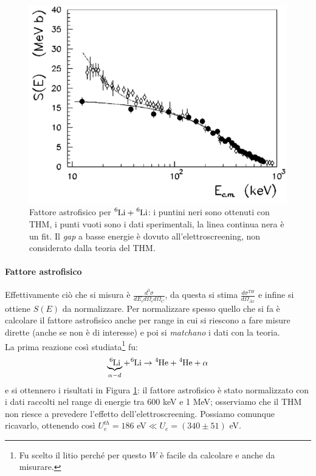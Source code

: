 \vspace{-1cm}
\begin{figure}[!h]
	\centering
	\includegraphics[scale=0.5]{Immagini/0421_Se.png}
	\caption{Fattore astrofisico per $\ce{^6Li} + \ce{^6Li}$: i puntini neri sono ottenuti con THM, i punti vuoti sono i dati sperimentali, la linea continua nera è un fit. Il \textit{gap} a basse energie è dovuto all'elettroscreening, non considerato dalla teoria del THM.}
	\label{0421_Se}
\end{figure}
\paragraph{Fattore astrofisico} Effettivamente ciò che si misura è $\frac{d^3\sigma}{dE_c d\Omega_cd\Omega_{C}}$, da questa si stima $\frac{d\sigma^{TH}}{d\Omega_{Ax}}$ e infine si ottiene $S(E)$ da normalizzare.
Per  normalizzare spesso quello che si fa è calcolare il fattore astrofisico anche per range in cui si riescono a fare misure dirette (anche se non è di interesse) e poi si \textit{matchano} i dati con la teoria.\\
La prima reazione così studiata\footnote{Fu scelto il litio perché per questo $W$ è facile da calcolare e anche da misurare.} fu:
$$ \underbrace{\ce{^6Li}}_{\alpha-d} + \ce{^6Li} \to \ce{^4He} + \ce{^4He} + \alpha $$
e si ottennero i risultati in Figura \ref{0421_Se}: il fattore astrofisico è stato normalizzato con i dati raccolti nel range di energie tra 600 keV e 1 MeV; osserviamo che il THM non riesce a prevedere l'effetto dell'elettroscreening. Possiamo comunque ricavarlo, ottenendo così $U_e^{th}=186$ eV$\ll U_e = (340\pm 51)$ eV.


